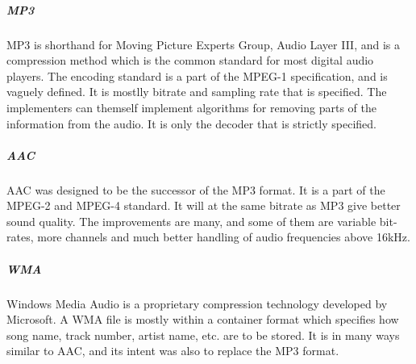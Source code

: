 \subparagraph{MP3} \hfill
\newline
MP3 is shorthand for Moving Picture Experts Group, Audio Layer III, and is a compression method which is the common standard for most digital audio players. The encoding standard is a part of the MPEG-1 specification, and is vaguely defined. It is mostlly bitrate and sampling rate that is specified. The implementers can themself implement algorithms for removing parts of the information from the audio. It is only the decoder that is strictly specified.
\cite{bib:MP3}


\subparagraph{AAC}\hfill
\newline
AAC was designed to be the successor of the MP3 format. It is a part of the MPEG-2 and MPEG-4 standard. It will at the same bitrate as MP3 give better sound quality. The improvements are many, and some of them are variable bit-rates, more channels  and much better handling of audio frequencies above 16kHz.
\cite{bib:AAC}


\subparagraph{WMA} \hfill
\newline
Windows Media Audio is a proprietary compression technology developed by Microsoft. A WMA file is mostly within a container format which specifies how song name, track number, artist name, etc. are to be stored. It is in many ways similar to AAC, and its intent was also to replace the MP3 format.
\cite{bib:WMA}

